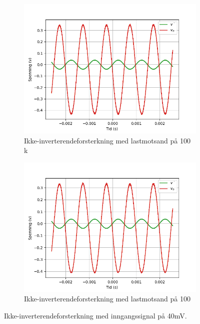 \begin{figure}[!hbt]
    \centering
    \begin{subfigure}{.5\textwidth}
        \centering
        \includegraphics[width=1\linewidth]{./Images/03Research/noninverting100k.png}
        \caption{Ikke-inverterendeforsterkning med lastmotsand på 100 k\text{$\Omega$}}
        \label{fig:ikkeinv100k}
    \end{subfigure}%
    \begin{subfigure}{.5\textwidth}
        \centering
        \includegraphics[width=1\linewidth]{./Images/03Research/noninverting100.png}
        \caption{Ikke-inverterendeforsterkning med lastmotsand på 100 \text{$\Omega$}}
        \label{fig:ikkeinv100}
    \end{subfigure}
    \caption{Ikke-inverterendeforsterkning med inngangssignal på 40mV.}
    \label{fig:ikkeinv}
\end{figure}

